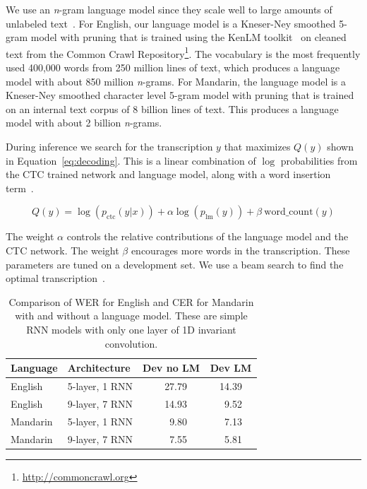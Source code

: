\documentclass{article}
\begin{document}
We use an \emph{n}-gram language model since they scale well to large amounts of unlabeled text~\cite{hannun2014deepspeech}. For English, our language model is a Kneser-Ney smoothed 5-gram model with pruning that is trained using the KenLM toolkit~\cite{heafield2013kenlm} on cleaned text from the Common Crawl Repository\footnote{\url{http://commoncrawl.org}}. The vocabulary is the most frequently used 400,000 words from 250 million lines of text, which produces a language model with about 850 million \emph{n}-grams. For Mandarin, the language model is a Kneser-Ney smoothed character level 5-gram model with pruning that is trained on an internal text corpus of 8 billion lines of text. This produces a language model with about 2 billion \emph{n}-grams.

During inference we search for the transcription $y$ that maximizes $Q(y)$ shown in Equation~\ref{eq:decoding}. This is a linear combination of $\log$ probabilities from the CTC trained network and language model, along with a word insertion term~\cite{hannun2014deepspeech}. 

\begin{equation}
\label{eq:decoding}
Q(y) = \log (p_{\textrm{ctc}}(y|x)) + \alpha \log(p_{\textrm{lm}}(y))  + \beta \: \textrm{word\_count}(y)
\end{equation}

The weight $\alpha$ controls the relative contributions of the language model and the CTC network. The weight $\beta$ encourages more words in the transcription. These parameters are tuned on a development set. We use a beam search to find the optimal transcription~\cite{hannun2014firstpass}.

\begin{table}
\centering
\begin{tabular}{l  l  r r r r r r}
\toprule
Language & Architecture & \multicolumn{3}{c}{Dev no LM} & \multicolumn{3}{c}{Dev LM} \\
\midrule
English  & 5-layer, 1 RNN & & 27.79 & & & 14.39 & \\
English  & 9-layer, 7 RNN & & 14.93 & & & 9.52 & \\
Mandarin & 5-layer, 1 RNN & & 9.80  & & & 7.13 & \\
Mandarin & 9-layer, 7 RNN & & 7.55  & & & 5.81 & \\
\bottomrule
\end{tabular}
\caption{Comparison of WER for English and CER for Mandarin with and without a language model. These are simple RNN models with only one layer of 1D invariant convolution.}
\label{table:languagemodels}
\end{table}
\end{document}
